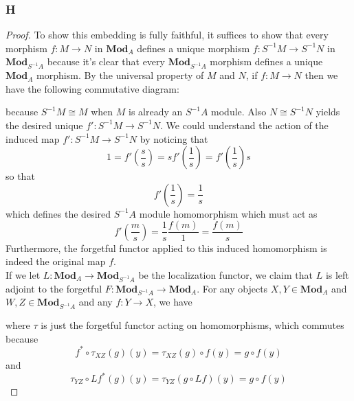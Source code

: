 \documentclass{article}
\newcommand{\Mod}{\mathbf{Mod}} %
\DeclareMathOperator{\Hom}{\mathrm{Hom}}
\begin{document}
\subsubsection{H}\label{1.5.H}
\begin{proof}
    To show this embedding is fully faithful, it suffices to show that every morphism $f:M\to N$ in $\Mod_A$ defines a unique morphism $f:S^{-1}M\to S^{-1}N$ in $\Mod_{S^{-1}A}$ because it's clear that every $\Mod_{S^{-1}A}$ morphism defines a unique $\Mod_A$ morphism. By the universal property of $M$ and $N$, if $f:M\to N$ then we have the following commutative diagram:
    \begin{center}
    \end{center}
    because $S^{-1}M\cong M$ when $M$ is already an $S^{-1}A$ module. Also $N\cong S^{-1}N$ yields the desired unique $f':S^{-1}M\to S^{-1}N$.
    We could understand the action of the induced map $f':S^{-1}M\to S^{-1}N$ by noticing that
    \[
    1=f'(\frac{s}{s})=sf'(\frac{1}{s})=f'(\frac{1}{s})s
    \]
    so that
    \[
    f'(\frac{1}{s})=\frac{1}{s}
    \]
    which defines the desired $S^{-1}A$ module homomorphism which must act as
    \[
    f'(\frac{m}{s})=\frac{1}{s}\frac{f(m)}{1}=\frac{f(m)}{s}
    \]
    Furthermore, the forgetful functor applied to this induced homomorphism is indeed the original map $f$.\\
    If we let $L:\Mod_A\to \Mod_{S^{-1}A}$ be the localization functor, we claim that $L$ is left adjoint to the forgetful $F:\Mod_{S^{-1}A}\to \Mod_A$. For any objects $X,Y\in \Mod_A$ and $W,Z\in \Mod_{S^{-1}A}$ and any $f:Y\to X$, we have
    \begin{center}
    \end{center}
    where $\tau$ is just the forgetful functor acting on homomorphisms, which commutes because
    \[
    f^*\circ \tau_{XZ}(g)(y)=\tau_{XZ}(g)\circ f(y)=g\circ f(y)
    \]
    and
    \[
    \tau_{YZ}\circ Lf^*(g)(y)=\tau_{YZ}(g\circ Lf)(y)=g\circ f(y)
\]
\end{proof}
\end{document}
